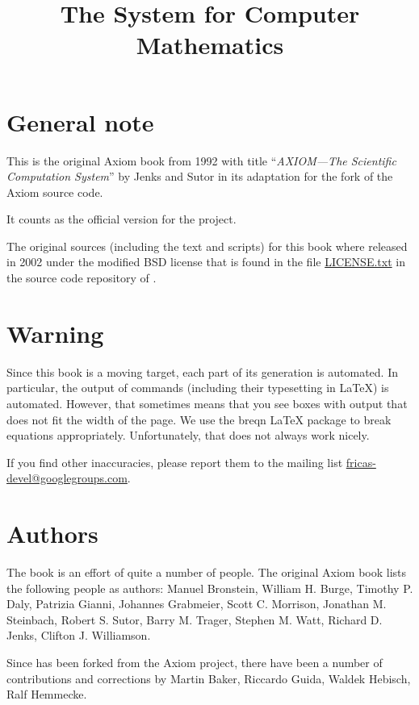 \documentclass[twoside,a4paper]{book}
\title{The \Language{} System for Computer Mathematics}
\begin{document}
\maketitle
{}%
\setcounter{page}{0}


\section*{General note}
This is the original Axiom book from 1992 with title %
``\emph{AXIOM---The Scientific Computation System}'' by Jenks and
Sutor in its adaptation for the \Language{} fork of the Axiom source
code.

It counts as the official version for the \Language{} project.

The original sources (including the text and scripts) for this book
where released in 2002 under the modified BSD license that is found in
the file
\href{https://github.com/fricas/fricas/blob/master/LICENSE.txt}{LICENSE.txt}
in the source code repository of \Language{}.


\section*{Warning}
Since this book is a moving target, each part of its generation is
automated. In particular, the output of \Language{} commands
(including their typesetting in \LaTeX{}) is automated. However, that
sometimes means that you see boxes with output that does not fit the
width of the page. We use the breqn \LaTeX{} package to break
equations appropriately. Unfortunately, that does not always work
nicely.

If you find other inaccuracies, please report them to the mailing list
\href{mailto:fricas-devel@googlegroups.com}{fricas-devel@googlegroups.com}.

\section*{Authors}

The book is an effort of quite a number of people.
%
The original Axiom book lists the following people as authors:
Manuel Bronstein,
William H. Burge,
Timothy P. Daly,
Patrizia Gianni,
Johannes Grabmeier,
Scott C. Morrison,
Jonathan M. Steinbach,
Robert S. Sutor,
Barry M. Trager,
Stephen M. Watt,
Richard D. Jenks,
Clifton J. Williamson.

Since \Language{} has been forked from the Axiom project, there have
been a number of contributions and corrections by Martin Baker,
Riccardo Guida, Waldek Hebisch, Ralf Hemmecke.
\end{document}
